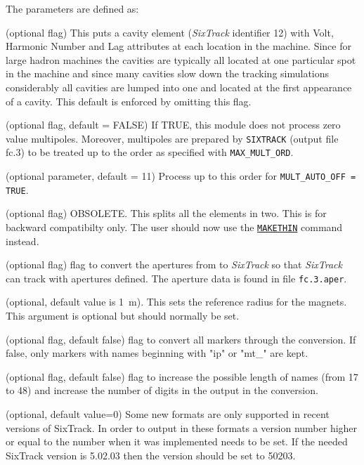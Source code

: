 The parameters are defined as: 
\begin{madlist}
    (optional flag) This puts a cavity element
   (\textit{SixTrack} identifier 12) with Volt, Harmonic Number and Lag
   attributes at each location in the machine. Since for large hadron
   machines the cavities are typically all located at one particular
   spot in the machine and since many cavities slow down the tracking
   simulations considerably all cavities are lumped into one and located
   at the first appearance of a cavity. This default is enforced by
   omitting this flag.  

    (optional flag, default = FALSE) If
   TRUE, this module does not process zero value multipoles. 
   Moreover, multipoles are prepared by \texttt{SIXTRACK}
   (output file fc.3) to be treated up to the order as specified with
   \texttt{MAX\_MULT\_ORD}.  

    (optional parameter, default = 11) Process up
   to this order for \texttt{MULT\_AUTO\_OFF = TRUE}.  

    (optional flag) OBSOLETE. This splits all the
   elements in  two. This is for backward compatibilty only. The user
   should now use the \hyperref[chap:makethin]{\texttt{MAKETHIN}} command
   instead.   

    (optional flag) flag to convert the apertures
   from \madx to \textit{SixTrack} so that \textit{SixTrack} can track
   with apertures defined. The aperture data is found in file
   \texttt{fc.3.aper}. 

    (optional, default value is 1~m). This sets the
   reference  radius for the magnets. This argument is optional but
   should normally be set. 

    (optional flag, default false) flag to convert all markers through the conversion. If false, only markers with names beginning with "ip" or "mt\_" are kept.

    (optional flag, default false) flag to increase the possible length of names (from 17 to 48) and increase the number of digits in the output in the conversion. 

    (optional, default value=0) Some new formats are only supported in recent versions of SixTrack. In order to output in these formats a version number higher or equal to the number when it was implemented needs to be set. If the needed SixTrack version is 5.02.03 then the version should be set to 50203.  

\end{madlist}

